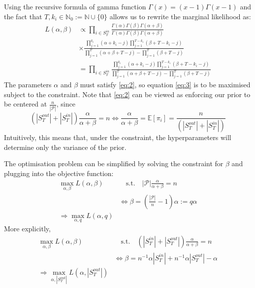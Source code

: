 \documentclass[a4paper, 12pt]{article}
\newcommand{\sout}[1][T]{|S^{out}_{#1}|}
\newcommand{\sint}[1][T]{|S^{in}_{#1}|}
\newcommand{\pop}{|\mathcal{P}|}
\begin{document}
Using the recursive formula of gamma function $\Gamma(x) = (x - 1)\Gamma(x - 1)$ and the fact that $T, k_i \in \mathbb{N}_0 := \mathbb{N} \cup \{0\}$ allows us to rewrite the marginal likelihood as:
\begin{align*}
    L(\alpha, \beta) &\propto \prod_{i \in S_T^{in}} \frac{\Gamma(\alpha) \Gamma(\beta) \Gamma(\alpha + \beta)}{\Gamma(\alpha)\Gamma(\beta)\Gamma(\alpha + \beta)}\\
    &\times \frac{\prod_{j=1}^{k_i} (\alpha + k_i - j)\prod_{j=1}^{T - k_i} (\beta + T - k_i - j)}{\prod_{j=1}^T(\alpha + \beta + T - j) - \prod_{j=1}^T (\beta + T - j)} \\
    &= \prod_{i \in S_T^{in}} \frac{\prod_{j=1}^{k_i} (\alpha + k_i - j)\prod_{j=1}^{T - k_i} (\beta + T - k_i - j)}{\prod_{j=1}^T(\alpha + \beta + T - j) - \prod_{j=1}^T (\beta + T - j)} 
\end{align*}
The parameters $\alpha$ and $\beta$ must satisfy \eqref{eq:2}, so equation \eqref{eq:3} is to be maximised subject to the constraint. Note that \eqref{eq:2} can be viewed as enforcing our prior to be centered at $\frac{n}{\pop}$, since 
\begin{equation*}
(|S_T^{out}| + |S_T^{in}|) \frac{\alpha}{\alpha + \beta} = n \Leftrightarrow \frac{\alpha}{\alpha + \beta} = \mathbb{E}[\pi_i] = \frac{n}{(|S_T^{out}| + |S_T^{in}|)}
\end{equation*}
Intuitively, this means that, under the constraint, the hyperparameters will determine only the variance of the prior.

The optimisation problem can be simplified by solving the constraint for $\beta$ and plugging into the objective function:
\begin{align*}
    \max_{\alpha, \beta} L(\alpha, \beta) &\quad \text{s.t.} \quad |\mathcal{P}|\frac{\alpha}{\alpha + \beta} = n \\
    &\Leftrightarrow \beta = \left(\frac{|\mathcal{P}|}{n} - 1 \right)\alpha := q\alpha\\
    \Rightarrow \max_{\alpha, q} L(\alpha, q) &
\end{align*}
More explicitly,
\begin{align*}
    \max_{\alpha, \beta} L(\alpha, \beta) &\quad \text{s.t.} \quad (\sint + \sout)\frac{\alpha}{\alpha + \beta} = n \\
    &\Leftrightarrow \beta = n^{-1}\alpha\sint + n^{-1}\alpha\sout - \alpha\\
    \Rightarrow \max_{\alpha, \sout} L(\alpha, \sout) &
\end{align*}
\end{document}
